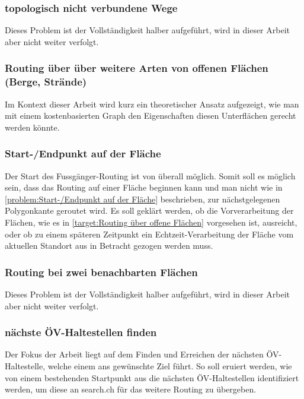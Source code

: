 \subsubsection{topologisch nicht verbundene Wege}
\label{target:topologisch nicht verbundene Wege}
Dieses Problem ist der Vollständigkeit halber aufgeführt, wird in dieser Arbeit aber nicht weiter verfolgt.

\subsubsection{Routing über über weitere Arten von offenen Flächen (Berge, Strände)}
\label{target:Routing über über weitere Arten von offenen Flächen (Berge, Strände)}
Im Kontext dieser Arbeit wird kurz ein theoretischer Ansatz aufgezeigt, wie man mit einem kostenbasierten Graph den Eigenschaften diesen Unterflächen gerecht werden könnte.

\subsubsection{Start-/Endpunkt auf der Fläche}
\label{target:Start-/Endpunkt auf der Fläche}
Der Start des Fussgänger-Routing ist von überall möglich. Somit soll es möglich sein, dass das Routing auf einer Fläche beginnen kann und man nicht wie in \ref{problem:Start-/Endpunkt auf der Fläche} beschrieben, zur nächstgelegenen Polygonkante geroutet wird. Es soll geklärt werden, ob die Vorverarbeitung der Flächen, wie es in \ref{target:Routing über offene Flächen} vorgesehen ist, ausreicht, oder ob zu einem späteren Zeitpunkt ein Echtzeit-Verarbeitung der Fläche vom aktuellen Standort aus in Betracht gezogen werden muss.

\subsubsection{Routing bei zwei benachbarten Flächen}
\label{target:Routing bei zwei benachbarten Flächen}
Dieses Problem ist der Vollständigkeit halber aufgeführt, wird in dieser Arbeit aber nicht weiter verfolgt.

\subsubsection{nächste ÖV-Haltestellen finden}
\label{target:nächste ÖV-Haltestellen finden}
Der Fokus der Arbeit liegt auf dem Finden und Erreichen der nächsten ÖV-Haltestelle, welche einem ans gewünschte Ziel führt. So soll eruiert werden, wie von einem bestehenden Startpunkt aus die nächsten ÖV-Haltestellen identifiziert werden, um diese an search.ch für das weitere Routing zu übergeben.

